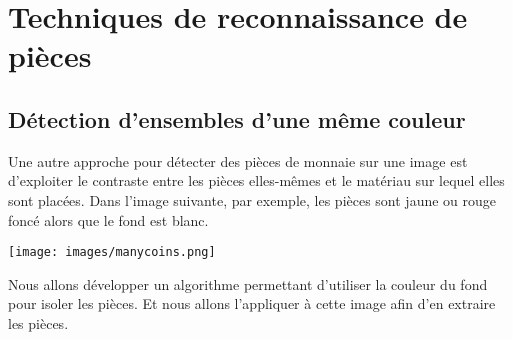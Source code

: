 \section{Techniques de reconnaissance de pièces}





\subsection{Détection d'ensembles d'une même couleur} %
Une autre approche pour détecter des pièces de monnaie sur une image est d'exploiter le contraste entre les pièces elles-mêmes et le matériau sur lequel elles sont placées. Dans l'image suivante, par exemple, les pièces sont jaune ou rouge foncé alors que le fond est blanc.

\begin{center}
\texttt{[image: images/manycoins.png]}
\end{center}

Nous allons développer un algorithme permettant d'utiliser la couleur du fond pour isoler les pièces. Et nous allons l'appliquer à cette image afin d'en extraire les pièces.